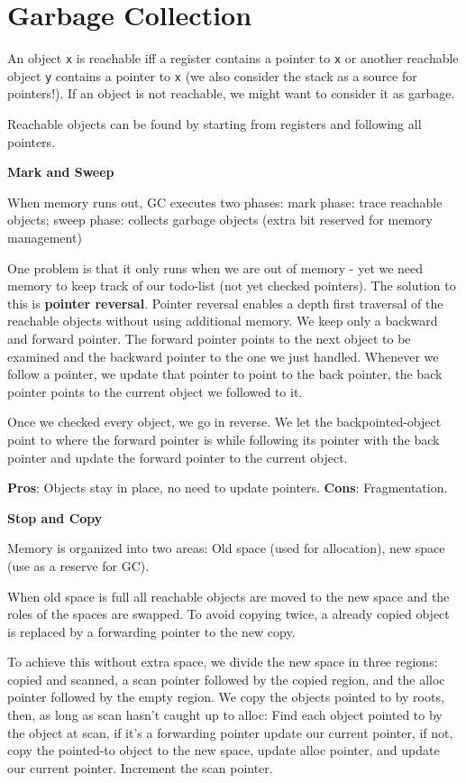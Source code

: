 \section*{Garbage Collection}

An object \texttt{x} is reachable iff a register contains a pointer to \texttt{x} or another reachable object \texttt{y} contains a pointer to \texttt{x} (we also consider the stack as a source for pointers!). If an object is not reachable, we might want to consider it as garbage. \medskip

Reachable objects can be found by starting from registers and following all pointers. \medskip

\textbf{Mark and Sweep} \smallskip

When memory runs out, GC executes two phases: mark phase: trace reachable objects; sweep phase: collects garbage objects (extra bit reserved for memory management)\medskip

One problem is that it only runs when we are out of memory - yet we need memory to keep track of our todo-list (not yet checked pointers). The solution to this is \textbf{pointer reversal}. Pointer reversal enables a depth first traversal of the reachable objects without using additional memory. We keep only a backward and forward pointer. The forward pointer points to the next object to be examined and the backward pointer to the one we just handled. Whenever we follow a pointer, we update that pointer to point to the back pointer, the back pointer points to the current object we followed to it. \medskip

Once we checked every object, we go in reverse. We let the backpointed-object point to where the forward pointer is while following its pointer with the back pointer and update the forward pointer to the current object. \medskip

\textbf{Pros}: Objects stay in place, no need to update pointers. \textbf{Cons}: Fragmentation.\medskip

\textbf{Stop and Copy} \smallskip

Memory is organized into two areas: Old space (used for allocation), new space (use as a reserve for GC). \medskip

When old space is full all reachable objects are moved to the new space and the roles of the spaces are swapped. To avoid copying twice, a already copied object is replaced by a forwarding pointer to the new copy. \medskip

To achieve this without extra space, we divide the new space in three regions: copied and scanned, a scan pointer followed by the copied region, and the alloc pointer followed by the empty region. We copy the objects pointed to by roots, then, as long as scan hasn't caught up to alloc: Find each object pointed to by the object at scan, if it's a forwarding pointer update our current pointer, if not, copy the pointed-to object to the new space, update alloc pointer, and update our current pointer. Increment the scan pointer. \medskip

